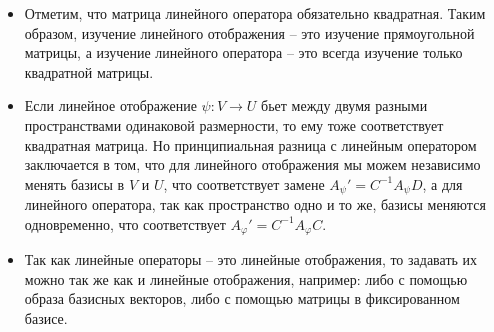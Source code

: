 \begin{itemize}
\item Отметим, что матрица линейного оператора обязательно квадратная.
Таким образом, изучение линейного отображения -- это изучение прямоугольной матрицы, а изучение линейного оператора -- это всегда изучение только квадратной матрицы.

\item Если линейное отображение $\psi\colon V\to U$ бьет между двумя разными пространствами одинаковой размерности, то ему тоже соответствует квадратная матрица.
Но принципиальная разница с линейным оператором заключается в том, что для линейного отображения мы можем независимо менять базисы в $V$ и $U$, что соответствует замене $A_\psi' = C^{-1}A_\psi D$, а для линейного оператора, так как пространство одно и то же, базисы меняются одновременно, что соответствует $A_\varphi' = C^{-1}A_\varphi C$.

\item Так как линейные операторы -- это линейные отображения, то задавать их можно так же как и линейные отображения, например: либо с помощью образа базисных векторов, либо с помощью матрицы в фиксированном базисе.
\end{itemize}
